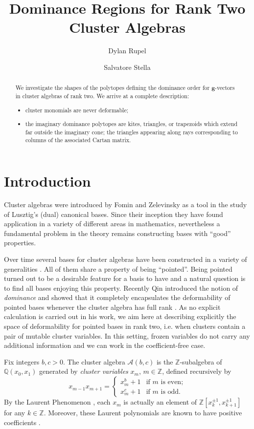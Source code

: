 \documentclass{amsart}
\title{Dominance Regions for Rank Two Cluster Algebras}
\author{Dylan Rupel}
\author{Salvatore Stella}
\numberwithin{theorem}{section}
\newcommand{\bfg}{\boldsymbol{g}}
\newcommand{\cA}{\mathcal{A}}
\newcommand{\QQ}{\mathbb{Q}}
\newcommand{\ZZ}{\mathbb{Z}}
\begin{document}
  \begin{abstract}
    We investigate the shapes of the polytopes defining the dominance order for $\bfg$-vectors in cluster algebras of rank two.
    We arrive at a complete description: 
    \begin{itemize}
      \item cluster monomials are never deformable;
      \item the imaginary dominance polytopes are kites, triangles, or trapezoids which extend far outside the imaginary cone; the triangles appearing along rays corresponding to columns of the associated Cartan matrix.
    \end{itemize}
  \end{abstract}
  \maketitle

  \section{Introduction}
  Cluster algebras were introduced by Fomin and Zelevinsky as a tool in the study of Lusztig's (dual) canonical bases.
  Since their inception they have found application in a variety of different areas in mathematics, nevertheless a fundamental problem in the theory remains constructing bases with ``good'' properties. 
  
  Over time several bases for cluster algebras have been constructed in a variety of generalities \cite{foo,bar,baz}. 
  All of them share a property of being ``pointed''.
  Being pointed turned out to be a desirable feature for a basis to have and a natural question is to find all bases enjoying this property.
  Recently Qin introduced the notion of \emph{dominance} and showed that it completely encapsulates the deformability of pointed bases whenever the cluster algebra has full rank \cite{Qin}. 
  As no explicit calculation is carried out in his work, we aim here at describing explicitly the space of deformability for pointed bases in rank two, i.e. when clusters contain a pair of mutable cluster variables.
  In this setting, frozen variables do not carry any additional information and we can work in the coefficient-free case. 

  Fix integers $b,c>0$.  The cluster algebra $\cA(b,c)$ is the $\ZZ$-subalgebra of $\QQ(x_0,x_1)$ generated by \emph{cluster variables} $x_m$, $m\in\ZZ$, defined recursively by
  \begin{equation}
    x_{m-1}x_{m+1}=\begin{cases} x_m^b+1 & \text{if $m$ is even;}\\ x_m^c+1 & \text{if $m$ is odd.} \end{cases}
  \end{equation}
  By the Laurent Phenomenon \cite{fomin-zelevinsky}, each $x_m$ is actually an element of $\ZZ[x_k^{\pm1},x_{k+1}^{\pm1}]$ for any $k\in\ZZ$.
  Moreover, these Laurent polynomials are known to have positive coefficients \cite{LLZ,lee-schiffler,GHKK}.
\end{document}

